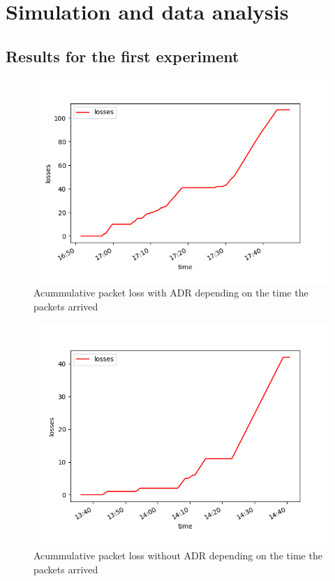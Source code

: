 \chapter{Simulation and data analysis}
\label{chap:fifth}
\ifpdf
    \graphicspath{{Chapter5/Figures/PNG/}{Chapter5/Figures/PDF/}{Chapter5/Figures/}}
\else
    \graphicspath{{Chapter5/Figures/EPS/}{Chapter5/Figures/}}
\fi

\section{Results for the first experiment}

\begin{figure}[htbp]
    \includegraphics[width=\linewidth]{Figure_1.png}
    \caption{Acummulative packet loss with ADR depending on the time the packets arrived}
    \label{chap:fifth:fig:1}
\end{figure}

\begin{figure}[htbp]
    \includegraphics[width=\linewidth]{Figure_1NoADR.png}
    \caption{Acummulative packet loss without ADR depending on the time the packets arrived}
    \label{chap:fifth:fig:1:noADR}
\end{figure}

